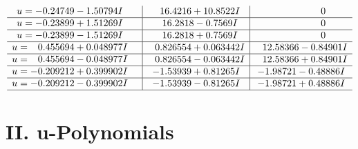\documentclass[1p]{elsarticle_modified}
\theoremstyle{definition}
\begin{document}
$$\begin{array}{c|c|c}
\begin{aligned}
u &= -0.24749 - 1.50794 I\end{aligned}
 & \phantom{-}16.4216 + 10.8522 I & \phantom{-0.000000 } 0 \\ \hline\begin{aligned}
u &= -0.23899 + 1.51269 I\end{aligned}
 & \phantom{-}16.2818 - 0.7569 I & \phantom{-0.000000 } 0 \\ \hline\begin{aligned}
u &= -0.23899 - 1.51269 I\end{aligned}
 & \phantom{-}16.2818 + 0.7569 I & \phantom{-0.000000 } 0 \\ \hline\begin{aligned}
u &= \phantom{-}0.455694 + 0.048977 I\end{aligned}
 & \phantom{-}0.826554 + 0.063442 I & \phantom{-}12.58366 - 0.84901 I \\ \hline\begin{aligned}
u &= \phantom{-}0.455694 - 0.048977 I\end{aligned}
 & \phantom{-}0.826554 - 0.063442 I & \phantom{-}12.58366 + 0.84901 I \\ \hline\begin{aligned}
u &= -0.209212 + 0.399902 I\end{aligned}
 & -1.53939 + 0.81265 I & -1.98721 - 0.48886 I \\ \hline\begin{aligned}
u &= -0.209212 - 0.399902 I\end{aligned}
 & -1.53939 - 0.81265 I & -1.98721 + 0.48886 I\\
 \hline 
 \end{array}$$\newpage
\newpage\renewcommand{\arraystretch}{1}
\centering \section*{ II. u-Polynomials}
\end{document}
